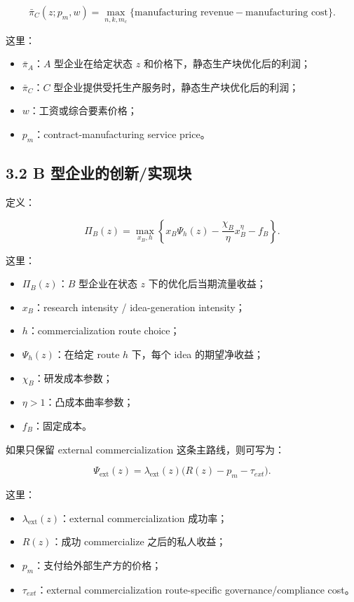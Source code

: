 \documentclass[12pt,fontset=none]{ctexart}
\begin{document}
\[
\bar{\pi}_C(z;p_m,w)
=
\max_{n,k,m_c}
\{\text{manufacturing revenue}-\text{manufacturing cost}\}.
\]

这里：

\begin{itemize}[leftmargin=2em]
    \item \(\bar{\pi}_A\)：\(A\) 型企业在给定状态 \(z\) 和价格下，静态生产块优化后的利润；
    \item \(\bar{\pi}_C\)：\(C\) 型企业提供受托生产服务时，静态生产块优化后的利润；
    \item \(w\)：工资或综合要素价格；
    \item \(p_m\)：contract-manufacturing service price。
\end{itemize}

\subsection{3.2 B 型企业的创新/实现块}

定义：

\[
\Pi_B(z)
=
\max_{x_B,h}
\left\{
x_B\Psi_h(z)-\frac{\chi_B}{\eta}x_B^\eta-f_B
\right\}.
\]

这里：

\begin{itemize}[leftmargin=2em]
    \item \(\Pi_B(z)\)：\(B\) 型企业在状态 \(z\) 下的优化后当期流量收益；
    \item \(x_B\)：research intensity / idea-generation intensity；
    \item \(h\)：commercialization route choice；
    \item \(\Psi_h(z)\)：在给定 route \(h\) 下，每个 idea 的期望净收益；
    \item \(\chi_B\)：研发成本参数；
    \item \(\eta>1\)：凸成本曲率参数；
    \item \(f_B\)：固定成本。
\end{itemize}

如果只保留 external commercialization 这条主路线，则可写为：

\[
\Psi_{\text{ext}}(z)
=
\lambda_{\text{ext}}(z)\bigl(R(z)-p_m-\tau_{ext}\bigr).
\]

这里：

\begin{itemize}[leftmargin=2em]
    \item \(\lambda_{\text{ext}}(z)\)：external commercialization 成功率；
    \item \(R(z)\)：成功 commercialize 之后的私人收益；
    \item \(p_m\)：支付给外部生产方的价格；
    \item \(\tau_{ext}\)：external commercialization route-specific governance/compliance cost。
\end{itemize}
\end{document}
